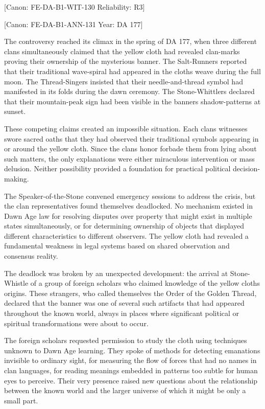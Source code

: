 {[}Canon: FE-DA-B1-WIT-130 \textbar{} Reliability: R3{]}

{[}Canon: FE-DA-B1-ANN-131 \textbar{} Year: DA 177{]}

The controversy reached its climax in the spring of DA 177, when three
different clans simultaneously claimed that the yellow cloth had
revealed clan-marks proving their ownership of the mysterious banner.
The Salt-Runners reported that their traditional wave-spiral had
appeared in the cloth\textquotesingle s weave during the full moon. The
Thread-Singers insisted that their needle-and-thread symbol had
manifested in its folds during the dawn ceremony. The Stone-Whittlers
declared that their mountain-peak sign had been visible in the
banner\textquotesingle s shadow-patterns at sunset.

These competing claims created an impossible situation. Each
clan\textquotesingle s witnesses swore sacred oaths that they had
observed their traditional symbols appearing in or around the yellow
cloth. Since the clans\textquotesingle{} honor forbade them from lying
about such matters, the only explanations were either miraculous
intervention or mass delusion. Neither possibility provided a foundation
for practical political decision-making.

The Speaker-of-the-Stone convened emergency sessions to address the
crisis, but the clan representatives found themselves deadlocked. No
mechanism existed in Dawn Age law for resolving disputes over property
that might exist in multiple states simultaneously, or for determining
ownership of objects that displayed different characteristics to
different observers. The yellow cloth had revealed a fundamental
weakness in legal systems based on shared observation and consensus
reality.

The deadlock was broken by an unexpected development: the arrival at
Stone-Whistle of a group of foreign scholars who claimed knowledge of
the yellow cloth\textquotesingle s origins. These strangers, who called
themselves the Order of the Golden Thread, declared that the banner was
one of several such artifacts that had appeared throughout the known
world, always in places where significant political or spiritual
transformations were about to occur.

The foreign scholars requested permission to study the cloth using
techniques unknown to Dawn Age learning. They spoke of methods for
detecting emanations invisible to ordinary sight, for measuring the flow
of forces that had no names in clan languages, for reading meanings
embedded in patterns too subtle for human eyes to perceive. Their very
presence raised new questions about the relationship between the known
world and the larger universe of which it might be only a small part.

